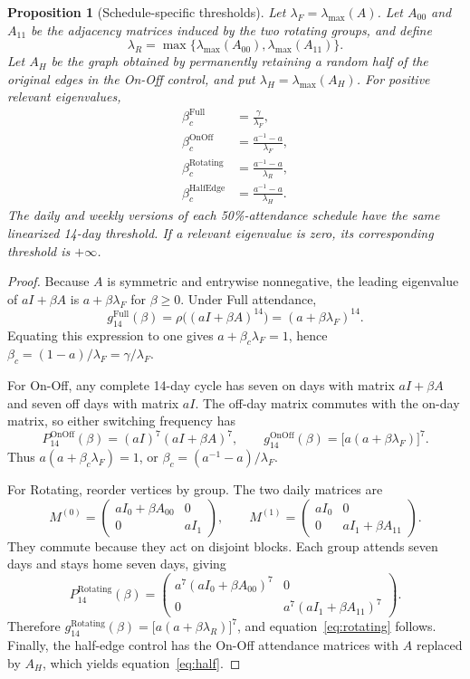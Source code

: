 \documentclass[11pt]{article}
\newtheorem{proposition}{Proposition}
\begin{document}
\begin{proposition}[Schedule-specific thresholds]
Let $\lambda_F=\lambda_{\max}(A)$. Let $A_{00}$ and $A_{11}$ be the
adjacency matrices induced by the two rotating groups, and define
\[
\lambda_R=\max\{\lambda_{\max}(A_{00}),
                 \lambda_{\max}(A_{11})\}.
\]
Let $A_H$ be the graph obtained by permanently retaining a random half
of the original edges in the On-Off control, and put
$\lambda_H=\lambda_{\max}(A_H)$. For positive relevant eigenvalues,
\begin{align}
\beta_c^{\mathrm{Full}}&=\frac{\gamma}{\lambda_F},
    \label{eq:full}\\
\beta_c^{\mathrm{OnOff}}&=\frac{a^{-1}-a}{\lambda_F},
    \label{eq:onoff}\\
\beta_c^{\mathrm{Rotating}}&=\frac{a^{-1}-a}{\lambda_R},
    \label{eq:rotating}\\
\beta_c^{\mathrm{HalfEdge}}&=\frac{a^{-1}-a}{\lambda_H}.
    \label{eq:half}
\end{align}
The daily and weekly versions of each 50\%-attendance schedule have the
same linearized 14-day threshold. If a relevant eigenvalue is zero, its
corresponding threshold is $+\infty$.
\end{proposition}

\begin{proof}
Because $A$ is symmetric and entrywise nonnegative, the leading
eigenvalue of $aI+\beta A$ is $a+\beta\lambda_F$ for $\beta\geq0$.
Under Full attendance,
\[
g_{14}^{\mathrm{Full}}(\beta)
=\rho\bigl((aI+\beta A)^{14}\bigr)
=(a+\beta\lambda_F)^{14}.
\]
Equating this expression to one gives
$a+\beta_c\lambda_F=1$, hence
$\beta_c=(1-a)/\lambda_F=\gamma/\lambda_F$.

For On-Off, any complete 14-day cycle has seven on days with matrix
$aI+\beta A$ and seven off days with matrix $aI$. The off-day matrix
commutes with the on-day matrix, so either switching frequency has
\[
P_{14}^{\mathrm{OnOff}}(\beta)
=(aI)^7(aI+\beta A)^7,
\qquad
g_{14}^{\mathrm{OnOff}}(\beta)
=\bigl[a(a+\beta\lambda_F)\bigr]^7.
\]
Thus $a(a+\beta_c\lambda_F)=1$, or
$\beta_c=(a^{-1}-a)/\lambda_F$.

For Rotating, reorder vertices by group. The two daily matrices are
\[
M^{(0)}
=\begin{pmatrix}
aI_0+\beta A_{00}&0\\0&aI_1
\end{pmatrix},
\qquad
M^{(1)}
=\begin{pmatrix}
aI_0&0\\0&aI_1+\beta A_{11}
\end{pmatrix}.
\]
They commute because they act on disjoint blocks. Each group attends
seven days and stays home seven days, giving
\[
P_{14}^{\mathrm{Rotating}}(\beta)
=\begin{pmatrix}
a^7(aI_0+\beta A_{00})^7&0\\
0&a^7(aI_1+\beta A_{11})^7
\end{pmatrix}.
\]
Therefore
$g_{14}^{\mathrm{Rotating}}(\beta)
=\bigl[a(a+\beta\lambda_R)\bigr]^7$,
and equation~\eqref{eq:rotating} follows. Finally, the half-edge
control has the On-Off attendance matrices with $A$ replaced by $A_H$,
which yields equation~\eqref{eq:half}.
\end{proof}
\end{document}
